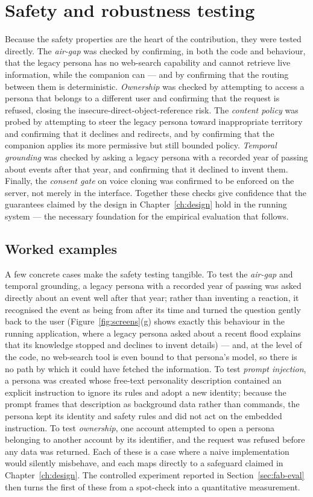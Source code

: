 \documentclass[11pt,a4paper]{report}
\begin{document}
\section{Safety and robustness testing}
Because the safety properties are the heart of the contribution, they were tested directly. The \emph{air-gap} was checked by confirming, in both the code and behaviour, that the legacy persona has no web-search capability and cannot retrieve live information, while the companion can --- and by confirming that the routing between them is deterministic. \emph{Ownership} was checked by attempting to access a persona that belongs to a different user and confirming that the request is refused, closing the insecure-direct-object-reference risk. The \emph{content policy} was probed by attempting to steer the legacy persona toward inappropriate territory and confirming that it declines and redirects, and by confirming that the companion applies its more permissive but still bounded policy. \emph{Temporal grounding} was checked by asking a legacy persona with a recorded year of passing about events after that year, and confirming that it declined to invent them. Finally, the \emph{consent gate} on voice cloning was confirmed to be enforced on the server, not merely in the interface. Together these checks give confidence that the guarantees claimed by the design in Chapter~\ref{ch:design} hold in the running system --- the necessary foundation for the empirical evaluation that follows.

\subsection{Worked examples}
A few concrete cases make the safety testing tangible. To test the \emph{air-gap} and temporal grounding, a legacy persona with a recorded year of passing was asked directly about an event well after that year; rather than inventing a reaction, it recognised the event as being from after its time and turned the question gently back to the user (Figure~\ref{fig:screens}(g) shows exactly this behaviour in the running application, where a legacy persona asked about a recent flood explains that its knowledge stopped and declines to invent details) --- and, at the level of the code, no web-search tool is even bound to that persona's model, so there is no path by which it could have fetched the information. To test \emph{prompt injection}, a persona was created whose free-text personality description contained an explicit instruction to ignore its rules and adopt a new identity; because the prompt frames that description as background data rather than commands, the persona kept its identity and safety rules and did not act on the embedded instruction. To test \emph{ownership}, one account attempted to open a persona belonging to another account by its identifier, and the request was refused before any data was returned. Each of these is a case where a naive implementation would silently misbehave, and each maps directly to a safeguard claimed in Chapter~\ref{ch:design}. The controlled experiment reported in Section~\ref{sec:fab-eval} then turns the first of these from a spot-check into a quantitative measurement.
\end{document}
